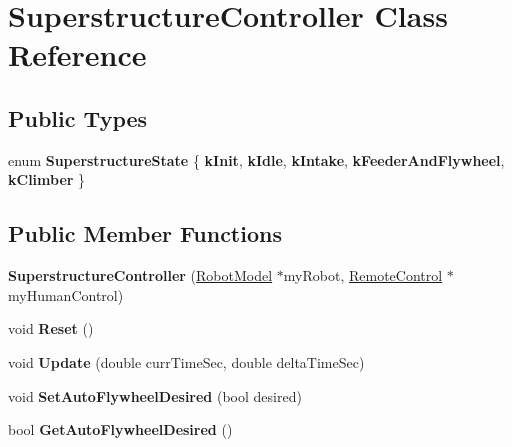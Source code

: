\hypertarget{class_superstructure_controller}{}\section{Superstructure\+Controller Class Reference}
\label{class_superstructure_controller}
\subsection*{Public Types}
\begin{DoxyCompactItemize}
\item 
\mbox{\label{class_superstructure_controller_a05547fe1daa5fa738306da3e73fc1f47}} 
enum {\bfseries Superstructure\+State} \{ \newline
{\bfseries k\+Init}, 
{\bfseries k\+Idle}, 
{\bfseries k\+Intake}, 
{\bfseries k\+Feeder\+And\+Flywheel}, 
\newline
{\bfseries k\+Climber}
 \}
\end{DoxyCompactItemize}
\subsection*{Public Member Functions}
\begin{DoxyCompactItemize}
\item 
\mbox{\label{class_superstructure_controller_a36c3ee9cd60b7d6931d913b70f358950}} 
{\bfseries Superstructure\+Controller} (\hyperlink{class_robot_model}{Robot\+Model} $\ast$my\+Robot, \hyperlink{class_remote_control}{Remote\+Control} $\ast$my\+Human\+Control)
\item 
\mbox{\label{class_superstructure_controller_a1dab262418ba343c7bd9b2b86a0172a0}} 
void {\bfseries Reset} ()
\item 
\mbox{\label{class_superstructure_controller_ac3e296c77a9e1f7f230a44cd70efa505}} 
void {\bfseries Update} (double curr\+Time\+Sec, double delta\+Time\+Sec)
\item 
\mbox{\label{class_superstructure_controller_a727aab210888e142e1a72e247aaba1ad}} 
void {\bfseries Set\+Auto\+Flywheel\+Desired} (bool desired)
\item 
\mbox{\label{class_superstructure_controller_afd3c2a393e14e5d3f52383afba19a792}} 
bool {\bfseries Get\+Auto\+Flywheel\+Desired} ()
\end{DoxyCompactItemize}

